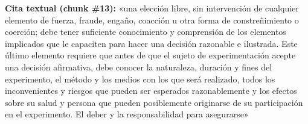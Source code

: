\documentclass[11pt]{article}
\begin{document}
\begin{mdframed}[backgroundcolor=qbg,linecolor=qrule,linewidth=1pt,leftline=true,topline=false,bottomline=false,rightline=false,innerleftmargin=8pt,innertopmargin=6pt,innerbottommargin=6pt]
{\small\textbf{Cita textual (chunk \#13):} «una elección libre, sin intervención de cualquier elemento de fuerza, fraude, engaño, coacción u otra forma de constreñimiento o coerción; debe tener suficiente conocimiento y comprensión de los elementos implicados que le capaciten para hacer una decisión razonable e ilustrada. Este último elemento requiere que antes de que el sujeto de experimentación acepte una decisión afirmativa, debe conocer la naturaleza, duración y fines del experimento, el método y los medios con los que será realizado, todos los inconvenientes y riesgos que pueden ser esperados razonablemente y los efectos sobre su salud y persona que pueden posiblemente originarse de su participación en el experimento. El deber y la responsabilidad para asegurarse»}
\end{mdframed}
\par
\vspace{0.9em}
\end{document}
